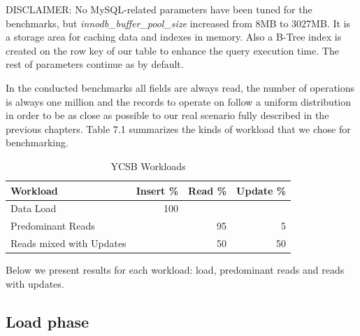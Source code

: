 \bigskip

DISCLAIMER: No MySQL-related parameters have been tuned for the benchmarks, but \textit{innodb\_buffer\_pool\_size} increased from 8MB to 3027MB. It is a storage area for caching data and indexes in memory. Also a B-Tree index is created on the row key of our table to enhance the query execution time. The rest of parameters continue as by default.

\bigskip

In the conducted benchmarks all fields are always read, the number of operations is always one million and the records to operate on follow a uniform distribution in order to be as close as possible to our real scenario fully described in the previous chapters. Table 7.1 summarizes the kinds of workload that we chose for benchmarking.

\begin{table}[htbp]

\begin{center}
\begin{tabular}{|l|l|l|l|}
\hline
Workload & Insert \% & Read \% & Update \% \\ \hline
Data Load & \multicolumn{1}{r|}{100} &  &  \\ \hline
Predominant Reads &  & \multicolumn{1}{r|}{95} & \multicolumn{1}{r|}{5} \\ \hline
Reads mixed with Updates &  & \multicolumn{1}{r|}{50} & \multicolumn{1}{r|}{50} \\ \hline
\end{tabular}
\caption{YCSB Workloads}
\end{center}

\label{Table YCSB Workloads.}
\end{table}

\par
Below we present results for each workload: load, predominant reads and reads with updates.


\subsection{Load phase}


